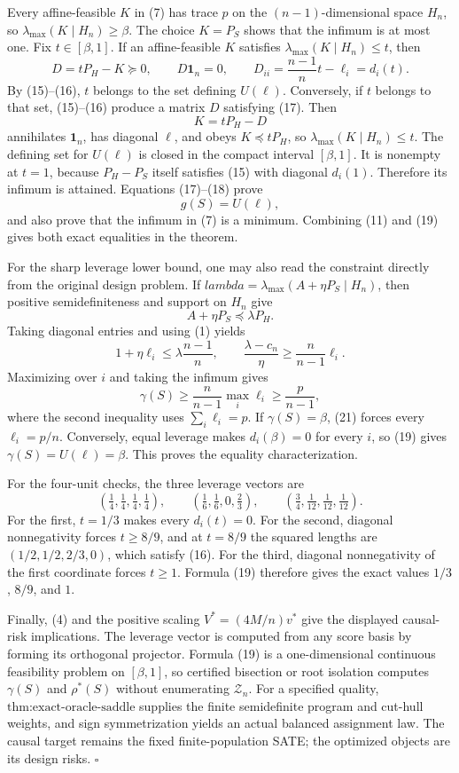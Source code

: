 Every affine-feasible \(K\) in (7) has trace \(p\) on the \((n-1)\)-dimensional space \(H_n\), so \(\lambda_{\max}(K\mid H_n)\geq\beta\).  The choice \(K=P_S\) shows that the infimum is at most one.  Fix \(t\in[\beta,1]\).  If an affine-feasible \(K\) satisfies \(\lambda_{\max}(K\mid H_n)\leq t\), then
\[
D=tP_H-K\succeq0,
\qquad
D\mathbf1_n=0,
\qquad
D_{ii}=\frac{n-1}{n}t-\ell_i=d_i(t).
\tag{17}
\]
By (15)--(16), \(t\) belongs to the set defining \(U(\ell)\).  Conversely, if \(t\) belongs to that set, (15)--(16) produce a matrix \(D\) satisfying (17).  Then
\[
K=tP_H-D
\tag{18}
\]
annihilates \(\mathbf1_n\), has diagonal \(\ell\), and obeys \(K\preceq tP_H\), so \(\lambda_{\max}(K\mid H_n)\leq t\).  The defining set for \(U(\ell)\) is closed in the compact interval \([\beta,1]\).  It is nonempty at \(t=1\), because \(P_H-P_S\) itself satisfies (15) with diagonal \(d_i(1)\).  Therefore its infimum is attained.  Equations (17)--(18) prove
\[
g(S)=U(\ell),
\tag{19}
\]
and also prove that the infimum in (7) is a minimum.  Combining (11) and (19) gives both exact equalities in the theorem.

For the sharp leverage lower bound, one may also read the constraint directly from the original design problem.  If
\(lambda=\lambda_{\max}(A+\eta P_S\mid H_n)\), then positive semidefiniteness and support on \(H_n\) give
\[
A+\eta P_S\preceq\lambda P_H.
\]
Taking diagonal entries and using (1) yields
\[
1+\eta\ell_i\leq\lambda\frac{n-1}{n},
\qquad
\frac{\lambda-c_n}{\eta}\geq\frac{n}{n-1}\ell_i.
\tag{20}
\]
Maximizing over \(i\) and taking the infimum gives
\[
\gamma(S)\geq\frac{n}{n-1}\max_i\ell_i\geq\frac{p}{n-1},
\tag{21}
\]
where the second inequality uses \(\sum_i\ell_i=p\).  If \(\gamma(S)=\beta\), (21) forces every \(\ell_i=p/n\).  Conversely, equal leverage makes \(d_i(\beta)=0\) for every \(i\), so (19) gives \(\gamma(S)=U(\ell)=\beta\).  This proves the equality characterization.

For the four-unit checks, the three leverage vectors are
\[
\left(\tfrac14,\tfrac14,\tfrac14,\tfrac14\right),
\qquad
\left(\tfrac16,\tfrac16,0,\tfrac23\right),
\qquad
\left(\tfrac34,\tfrac1{12},\tfrac1{12},\tfrac1{12}\right).
\tag{22}
\]
For the first, \(t=1/3\) makes every \(d_i(t)=0\).  For the second, diagonal nonnegativity forces \(t\geq8/9\), and at \(t=8/9\) the squared lengths are \((1/2,1/2,2/3,0)\), which satisfy (16).  For the third, diagonal nonnegativity of the first coordinate forces \(t\geq1\).  Formula (19) therefore gives the exact values \(1/3\), \(8/9\), and \(1\).

Finally, (4) and the positive scaling \(V^*=(4M/n)v^*\) give the displayed causal-risk implications.  The leverage vector is computed from any score basis by forming its orthogonal projector.  Formula (19) is a one-dimensional continuous feasibility problem on \([\beta,1]\), so certified bisection or root isolation computes \(\gamma(S)\) and \(\rho^*(S)\) without enumerating \(\mathcal Z_n\).  For a specified quality, \(\text{thm:exact-oracle-saddle}\) supplies the finite semidefinite program and cut-hull weights, and sign symmetrization yields an actual balanced assignment law.  The causal target remains the fixed finite-population SATE; the optimized objects are its design risks. \(\square\)